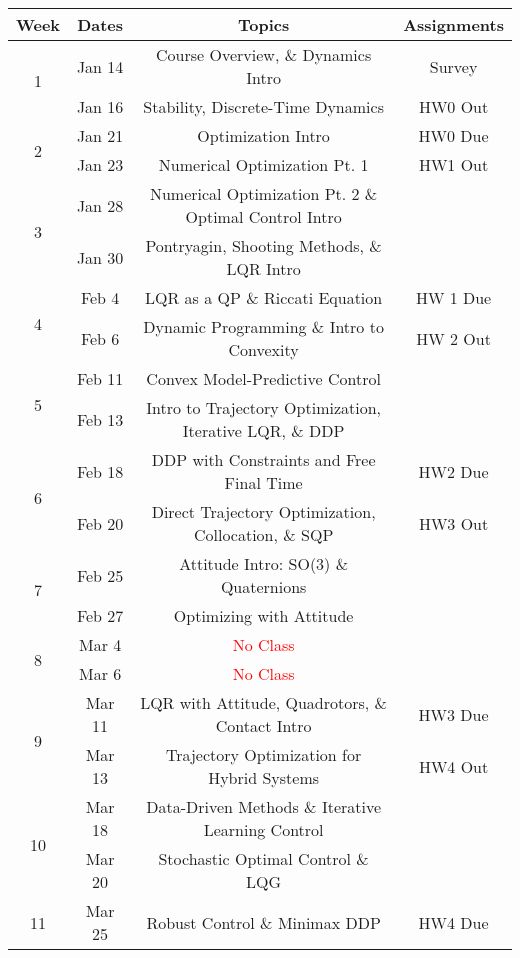 \documentclass[11pt,letterpaper]{article}
\begin{document}
\begin{tabular}{c|c|c|c}
	Week & Dates & Topics & Assignments \\
	\hline
	\multirow{2}{*}{1} & Jan 14 & 
        Course Overview, \& Dynamics Intro & Survey \\
	 & Jan 16 & Stability, Discrete-Time Dynamics &  HW0 Out\\
	\hline
	\multirow{2}{*}{2} & Jan 21 &
        Optimization Intro & HW0 Due \\
	 & Jan 23 & Numerical Optimization Pt. 1 & HW1 Out \\
	\hline
	\multirow{2}{*}{3}  & Jan 28 &
        Numerical Optimization Pt. 2 \& Optimal Control Intro &  \\
	 & Jan 30 & Pontryagin, Shooting Methods, \& LQR Intro &  \\
	\hline
	\multirow{2}{*}{4}  & Feb 4 &
        LQR as a QP \& Riccati Equation & HW 1 Due \\
	 & Feb 6 & Dynamic Programming \& Intro to Convexity & HW 2 Out \\
	\hline
	\multirow{2}{*}{5}  & Feb 11 &  Convex Model-Predictive Control & \\
	 & Feb 13 & Intro to Trajectory Optimization, Iterative LQR, \& DDP &  \\
	\hline
	\multirow{2}{*}{6}  & Feb 18 & DDP with Constraints and Free Final Time & HW2 Due \\
	 & Feb 20 & Direct Trajectory Optimization, Collocation, \& SQP & HW3 Out \\
	\hline
	\multirow{2}{*}{7}  & Feb 25 & Attitude Intro: SO(3) \& Quaternions
         & \\
	 & Feb 27 &  Optimizing with Attitude& \\
	\hline
	\multirow{2}{*}{8}  & Mar 4 & 
        \textcolor{red}{No Class} & \\
	 & Mar 6 & \textcolor{red}{No Class} &   \\
	\hline
	\multirow{2}{*}{9}  & Mar 11 & LQR with Attitude, Quadrotors, \& Contact Intro
         & HW3 Due \\
	 & Mar 13 & Trajectory Optimization for Hybrid Systems & HW4 Out \\
	\hline
	\multirow{2}{*}{10}  & Mar 18 & Data-Driven Methods \& Iterative Learning Control
         &  \\
	 & Mar 20 & Stochastic Optimal Control \& LQG &   \\
	 \hline
	\multirow{2}{*}{11}  & Mar 25 &Robust Control \& Minimax DDP
         & HW4 Due \\

\end{tabular}
\end{document}
